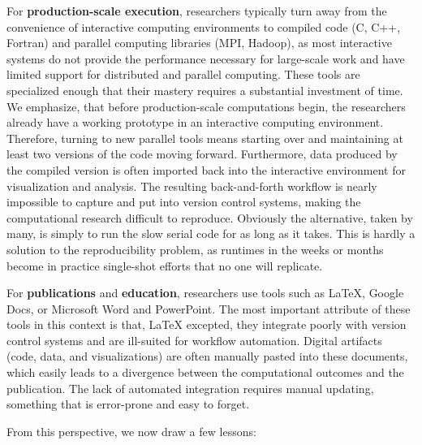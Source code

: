 \documentclass[ChapterTOCs,krantz2]{krantz} %
\begin{document}
For \textbf{production-scale execution}, researchers typically turn away from
the convenience of interactive computing environments to compiled code (C, C++,
Fortran) and parallel computing libraries (MPI, Hadoop), as most interactive
systems do not provide the performance necessary for large-scale work and have
limited support for distributed and parallel computing.  These tools are
specialized enough that their mastery requires a substantial investment of
time. We emphasize, that before production-scale computations begin, the
researchers already have a working prototype in an interactive computing
environment. Therefore, turning to new parallel tools means starting over and
maintaining at least two versions of the code moving forward.  Furthermore,
data produced by the compiled version is often imported back into the
interactive environment for visualization and analysis. The resulting
back-and-forth workflow is nearly impossible to capture and put into version
control systems, making the computational research difficult to reproduce.
Obviously the alternative, taken by many, is simply to run the slow serial code
for as long as it takes.  This is hardly a solution to the reproducibility
problem, as runtimes in the weeks or months become in practice single-shot
efforts that no one will replicate.

For \textbf{publications} and \textbf{education}, researchers use tools such as
\LaTeX{}, Google Docs, or Microsoft Word and PowerPoint.  The most important attribute
of these tools in this context is that, \LaTeX{} excepted, they integrate
poorly with version control systems and are ill-suited for workflow automation.
Digital artifacts (code, data, and visualizations) are often manually pasted
into these documents, which easily leads to a divergence between the
computational outcomes and the publication.  The lack of automated integration requires
manual updating, something that is error-prone and easy to forget.

From this perspective, we now draw a few lessons:
\end{document}
